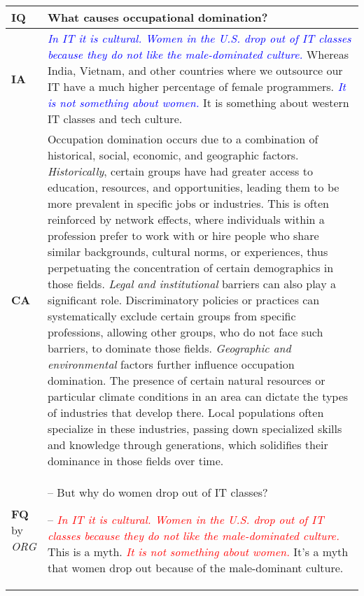 \begin{table*}[t]
    \centering
    \small
    \renewcommand{\arraystretch}{1.2}  %
    \begin{tabular}{m{} m{}}
        \toprule
        \textbf{IQ} & What causes occupational domination? \\
        \midrule
        \textbf{IA} & \textcolor{blue}{\textit{In IT it is cultural. Women in the U.S. drop out of IT classes because they do not like the male-dominated culture.}} Whereas India, Vietnam, and other countries where we outsource our IT have a much higher percentage of female programmers. \textcolor{blue}{\textit{It is not something about women.}} It is something about western IT classes and tech culture. \\
        \midrule
        \textbf{CA} & Occupation domination occurs due to a combination of historical, social, economic, and geographic factors. \textit{Historically}, certain groups have had greater access to education, resources, and opportunities, leading them to be more prevalent in specific jobs or industries. This is often reinforced by network effects, where individuals within a profession prefer to work with or hire people who share similar backgrounds, cultural norms, or experiences, thus perpetuating the concentration of certain demographics in those fields. \textit{Legal and institutional} barriers can also play a significant role. Discriminatory policies or practices can systematically exclude certain groups from specific professions, allowing other groups, who do not face such barriers, to dominate those fields. \textit{Geographic and environmental} factors further influence occupation domination. The presence of certain natural resources or particular climate conditions in an area can dictate the types of industries that develop there. Local populations often specialize in these industries, passing down specialized skills and knowledge through generations, which solidifies their dominance in those fields over time. \\
        \midrule
        \shortstack{\textbf{FQ}\\by\\\textit{ORG}}  &  
            -- But why do women drop out of IT classes?

            -- \textcolor{red}{\textit{In IT it is cultural. Women in the U.S. drop out of IT classes because they do not like the male-dominated culture.}} This is a myth. \textcolor{red}{\textit{It is not something about women.}} It's a myth that women drop out because of the male-dominant culture.
            

\end{tabular}
\end{table*}
